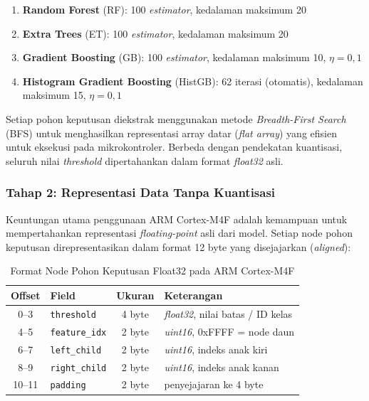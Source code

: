 \begin{enumerate}
    \item \textbf{Random Forest} (RF): 100 \textit{estimator}, kedalaman maksimum 20
    \item \textbf{Extra Trees} (ET): 100 \textit{estimator}, kedalaman maksimum 20
    \item \textbf{Gradient Boosting} (GB): 100 \textit{estimator}, kedalaman maksimum 10, $\eta = 0{,}1$
    \item \textbf{Histogram Gradient Boosting} (HistGB): 62 iterasi (otomatis), kedalaman maksimum 15, $\eta = 0{,}1$
\end{enumerate}

Setiap pohon keputusan diekstrak menggunakan metode \textit{Breadth-First Search} (BFS) untuk menghasilkan representasi array datar (\textit{flat array}) yang efisien untuk eksekusi pada mikrokontroler. Berbeda dengan pendekatan kuantisasi, seluruh nilai \textit{threshold} dipertahankan dalam format \textit{float32} asli.

\subsubsection{Tahap 2: Representasi Data Tanpa Kuantisasi}

Keuntungan utama penggunaan ARM Cortex-M4F adalah kemampuan untuk mempertahankan representasi \textit{floating-point} asli dari model. Setiap node pohon keputusan direpresentasikan dalam format 12 byte yang disejajarkan (\textit{aligned}):

\begin{table}[htbp]
\centering
\caption{Format Node Pohon Keputusan Float32 pada ARM Cortex-M4F}
\label{tab:arm_node_format}
\begin{tabular}{clcl}
\hline
\textbf{Offset} & \textbf{Field} & \textbf{Ukuran} & \textbf{Keterangan} \\
\hline
0--3 & \texttt{threshold} & 4 byte & \textit{float32}, nilai batas / ID kelas \\
4--5 & \texttt{feature\_idx} & 2 byte & \textit{uint16}, 0xFFFF = node daun \\
6--7 & \texttt{left\_child} & 2 byte & \textit{uint16}, indeks anak kiri \\
8--9 & \texttt{right\_child} & 2 byte & \textit{uint16}, indeks anak kanan \\
10--11 & \texttt{padding} & 2 byte & penyejajaran ke 4 byte \\
\hline
\end{tabular}
\end{table}

